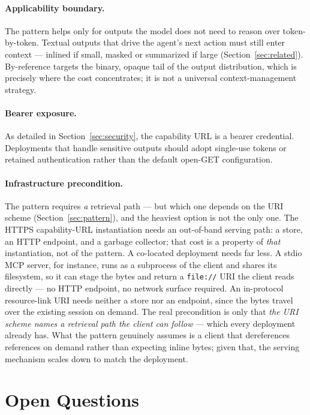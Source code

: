 \documentclass[11pt]{article}
\begin{document}
\paragraph{Applicability boundary.} The pattern helps only for outputs the model does not need to reason over token-by-token. Textual outputs that drive the agent's next action must still enter context --- inlined if small, masked or summarized if large (Section~\ref{sec:related}). By-reference targets the binary, opaque tail of the output distribution, which is precisely where the cost concentrates; it is not a universal context-management strategy.

\paragraph{Bearer exposure.} As detailed in Section~\ref{sec:security}, the capability URL is a bearer credential. Deployments that handle sensitive outputs should adopt single-use tokens or retained authentication rather than the default open-GET configuration.

\paragraph{Infrastructure precondition.} The pattern requires \emph{a} retrieval path --- but which one depends on the URI scheme (Section~\ref{sec:pattern}), and the heaviest option is not the only one. The HTTPS capability-URL instantiation needs an out-of-band serving path: a store, an HTTP endpoint, and a garbage collector; that cost is a property of \emph{that} instantiation, not of the pattern. A co-located deployment needs far less. A stdio MCP server, for instance, runs as a subprocess of the client and shares its filesystem, so it can stage the bytes and return a \texttt{file://} URI the client reads directly --- no HTTP endpoint, no network surface required. An in-protocol resource-link URI needs neither a store nor an endpoint, since the bytes travel over the existing session on demand. The real precondition is only that \emph{the URI scheme names a retrieval path the client can follow} --- which every deployment already has. What the pattern genuinely assumes is a client that dereferences references on demand rather than expecting inline bytes; given that, the serving mechanism scales down to match the deployment.

\section{Open Questions}\label{sec:open}
\end{document}
